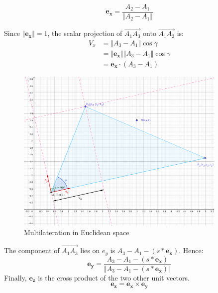 \documentclass[\main/main.tex]{subfiles}
\begin{document}
\begin{equation}
    \boldsymbol{e_x} = \frac{A_2-A_1}{\Vert A_2 - A_1\Vert}
    \label{eqn:multilateration_ex}
\end{equation}

Since $\Vert \boldsymbol{e_x} \Vert = 1$, the scalar projection of $\overrightarrow{A_1A_3}$ onto $\overrightarrow{A_1A_2}$ is:
\begin{equation}
    \begin{split}
    V_x &= \Vert A_3 - A_1 \Vert \cos{\gamma} \\
    &= \Vert \boldsymbol{e_x} \Vert \Vert A_3 - A_1 \Vert \cos{\gamma}\\
    &= \boldsymbol{e_x} \cdot (A_3 - A_1)      
    \end{split}
\end{equation}

\begin{figure}[H]
    \centering
    \includegraphics[width=0.9\textwidth]{multilateration.png}
    \caption{Multilateration in Euclidean space}
    \label{fig:multilateration}
\end{figure}

The component of $\overrightarrow{A_1A_3}$ lies on $e_y$ is $A_3-A_1-(s*\boldsymbol{e_x})$. Hence:
\begin{equation}
    \boldsymbol{e_y} = \frac{A_3-A_1-(s*\boldsymbol{e_x})}{\Vert A_3-A_1-(s*\boldsymbol{e_x})\Vert}
\end{equation}
Finally, $\boldsymbol{e_z}$ is the cross product of the two other unit vectors.
\begin{equation}
    \boldsymbol{e_z} = \boldsymbol{e_x} \times \boldsymbol{e_y}
\end{equation}
\end{document}
